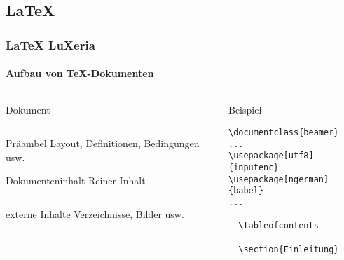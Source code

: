 \subsection{\LaTeX}
\begin{frame}[fragile]
	\frametitle{\LaTeX \hfill{} \footnotesize{LuXeria}}
	\framesubtitle{Aufbau von \TeX-Dokumenten}
	\begin{columns}
		\begin{column}{5cm}
			\begin{block}{Dokument}
				\begin{columns}
				\begin{column}{4cm}
				\begin{exampleblock}{Präambel}
					Layout, Definitionen, Bedingungen usw.
				\end{exampleblock}
				\begin{exampleblock}{Dokumenteninhalt}
					Reiner Inhalt
					\begin{columns}
						\begin{column}{3cm}
							\begin{alertblock}{externe Inhalte}
								Verzeichnisse, Bilder usw.
							\end{alertblock}
						\end{column}
					\end{columns}
				\end{exampleblock}
			\end{column}
			\end{columns}
			\end{block}
		\end{column}
		\begin{column}{5cm}
			\begin{block}{Beispiel}
			\begin{lstlisting}
\documentclass{beamer}
...
\usepackage[utf8]{inputenc}
\usepackage[ngerman]{babel}
...

  \tableofcontents
			
  \section{Einleitung}
    
    
			
			\end{lstlisting}
			\end{block}
		\end{column}
	\end{columns}
\end{frame}


